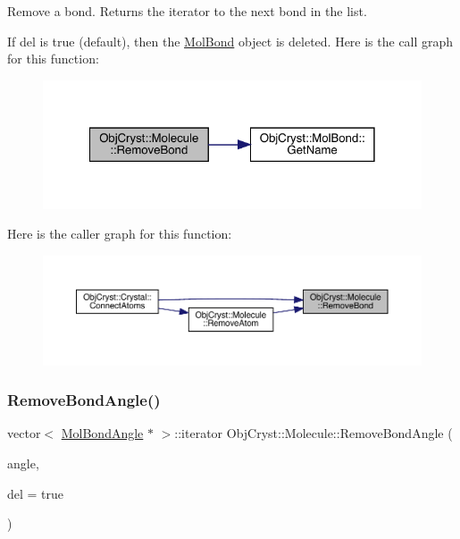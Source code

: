 Remove a bond. Returns the iterator to the next bond in the list.

If del is true (default), then the \mbox{\hyperlink{class_obj_cryst_1_1_mol_bond}{Mol\+Bond}} object is deleted. Here is the call graph for this function\+:
\nopagebreak
\begin{figure}[H]
\begin{center}
\leavevmode
\includegraphics[width=322pt]{class_obj_cryst_1_1_molecule_aa02f2f7cea34333b5ddbb4a16678b7a4_cgraph}
\end{center}
\end{figure}
Here is the caller graph for this function\+:
\nopagebreak
\begin{figure}[H]
\begin{center}
\leavevmode
\includegraphics[width=350pt]{class_obj_cryst_1_1_molecule_aa02f2f7cea34333b5ddbb4a16678b7a4_icgraph}
\end{center}
\end{figure}
\mbox{\label{class_obj_cryst_1_1_molecule_a07ae7127f13c0527530074756093a653}} 
\subsubsection{\texorpdfstring{RemoveBondAngle()}{RemoveBondAngle()}}
{\footnotesize\ttfamily vector$<$ \mbox{\hyperlink{class_obj_cryst_1_1_mol_bond_angle}{Mol\+Bond\+Angle}} $\ast$ $>$\+::iterator Obj\+Cryst\+::\+Molecule\+::\+Remove\+Bond\+Angle (\begin{DoxyParamCaption}\item[{const \mbox{\hyperlink{class_obj_cryst_1_1_mol_bond_angle}{Mol\+Bond\+Angle}} \&}]{angle,  }\item[{const bool}]{del = {\ttfamily true} }\end{DoxyParamCaption})}

